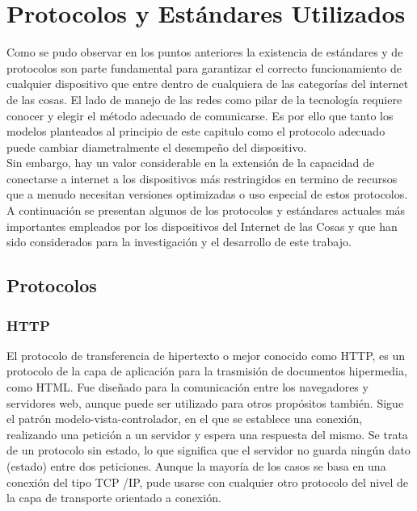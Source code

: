 \section{Protocolos y Estándares Utilizados}
Como se pudo observar en los puntos anteriores la existencia de estándares y de protocolos son parte fundamental para garantizar el correcto funcionamiento de cualquier dispositivo que entre dentro de cualquiera de las categorías del internet de las cosas. El lado de manejo de las redes como pilar de la tecnología requiere conocer y elegir el método adecuado de comunicarse. Es por ello que tanto los modelos planteados al principio de este capitulo\cite{rfc7452} como el protocolo adecuado puede cambiar diametralmente el desempeño del dispositivo.\\

Sin embargo, hay un valor considerable en la extensión de la capacidad de conectarse a internet a los dispositivos más restringidos en termino de recursos que a menudo necesitan versiones optimizadas o uso especial de estos protocolos. A continuación se presentan algunos de los protocolos y estándares actuales más importantes empleados por los dispositivos del Internet de las Cosas y que han sido considerados para la investigación y el desarrollo de este trabajo.

\subsection{Protocolos}
\subsubsection{HTTP}
El protocolo de transferencia de hipertexto o mejor conocido como HTTP, es un protocolo de la capa de aplicación para la trasmisión de documentos hipermedia, como HTML. Fue diseñado para la comunicación entre los navegadores y servidores web, aunque puede ser utilizado para otros propósitos también. Sigue el patrón modelo-vista-controlador, en el que se establece una conexión, realizando una petición a un servidor y espera una respuesta del mismo. Se trata de un protocolo sin estado, lo que significa que el servidor no guarda ningún dato (estado) entre dos peticiones. Aunque la mayoría de los casos se basa en una conexión del tipo TCP /IP, pude usarse con cualquier otro protocolo del nivel de la capa de transporte orientado a conexión.\cite{mozillahttp}\\

